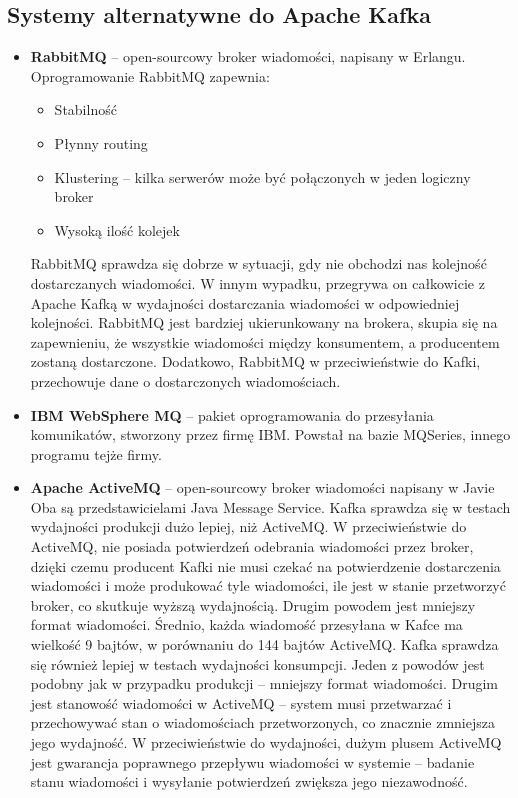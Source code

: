 \documentclass[a4paper,12pt]{article}
\begin{document}
\subsection{Systemy alternatywne do Apache Kafka}
\begin{itemize}
\item \textbf{RabbitMQ} – open-sourcowy broker wiadomości, napisany w Erlangu. Oprogramowanie RabbitMQ zapewnia:
\begin{itemize}
\item Stabilność
\item Płynny routing
\item Klustering – kilka serwerów może być połączonych w jeden logiczny broker
\item Wysoką ilość kolejek
\end{itemize}
RabbitMQ sprawdza się dobrze w sytuacji, gdy nie obchodzi nas kolejność dostarczanych wiadomości. W innym wypadku, przegrywa on całkowicie z Apache Kafką w wydajności dostarczania wiadomości w odpowiedniej kolejności. RabbitMQ jest bardziej ukierunkowany na brokera, skupia się na zapewnieniu, że wszystkie wiadomości między konsumentem, a producentem zostaną dostarczone. Dodatkowo, RabbitMQ w przeciwieństwie do Kafki, przechowuje dane o dostarczonych wiadomościach.
\item \textbf{IBM WebSphere MQ} – pakiet oprogramowania do przesyłania komunikatów, stworzony przez firmę IBM. Powstał na bazie MQSeries, innego programu tejże firmy. 
\item \textbf{Apache ActiveMQ} – open-sourcowy broker wiadomości napisany w Javie
Oba są przedstawicielami Java Message Service.
Kafka sprawdza się w testach wydajności produkcji dużo lepiej, niż ActiveMQ. W przeciwieństwie do ActiveMQ, nie posiada potwierdzeń odebrania wiadomości przez broker, dzięki czemu producent Kafki nie musi czekać na potwierdzenie dostarczenia wiadomości i  może produkować tyle wiadomości, ile jest w stanie przetworzyć broker, co skutkuje wyższą wydajnością. Drugim powodem jest mniejszy format wiadomości. Średnio, każda wiadomość przesyłana w Kafce ma wielkość 9 bajtów, w porównaniu do 144 bajtów ActiveMQ.
Kafka sprawdza się również lepiej w testach wydajności konsumpcji. Jeden z powodów jest podobny jak w przypadku produkcji – mniejszy format wiadomości. Drugim jest stanowość wiadomości w ActiveMQ – system musi przetwarzać i przechowywać stan o wiadomościach przetworzonych, co znacznie zmniejsza jego wydajność.
W przeciwieństwie do wydajności, dużym plusem ActiveMQ jest gwarancja poprawnego przepływu wiadomości w systemie – badanie stanu wiadomości i wysyłanie potwierdzeń zwiększa jego niezawodność.

\end{itemize}
\newpage
\end{document}
